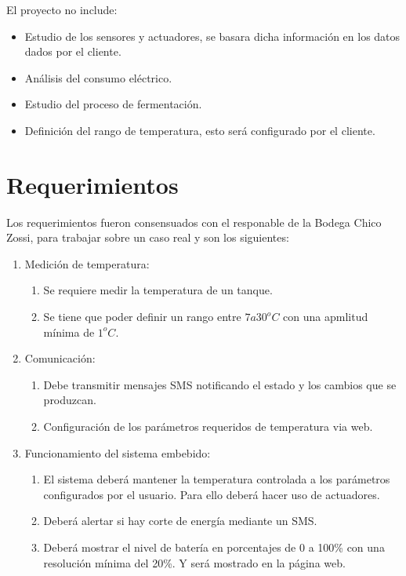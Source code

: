 El proyecto no include:
  \begin{itemize}
    \item Estudio de los sensores y actuadores, se basara dicha información en los datos dados por el cliente. 
    \item Análisis del consumo eléctrico.
    \item Estudio del proceso de fermentación.
    \item Definición del rango de temperatura, esto será configurado por el cliente.
  \end{itemize}

  \section{Requerimientos}

Los requerimientos fueron consensuados con el responable de la Bodega Chico Zossi, para trabajar sobre un caso real y son los siguientes:

\begin{enumerate}[label*=\arabic*.]
  \item Medición de temperatura:
    \begin{enumerate}[label*=\arabic*.]
      \item Se requiere medir la temperatura de un tanque.
      \item Se tiene que poder definir un rango entre $7 a 30^oC$ con una apmlitud mínima de $1^oC$.
    \end{enumerate}
  \item Comunicación:
    \begin{enumerate}[label*=\arabic*.]
      \item Debe transmitir mensajes SMS notificando el estado y los cambios que se produzcan.
      \item Configuración de los parámetros requeridos de temperatura via web. 
    \end{enumerate}
  \item Funcionamiento del sistema embebido:
    \begin{enumerate}[label*=\arabic*.]
      \item El sistema deberá mantener la temperatura controlada a los parámetros configurados por el usuario. Para ello deberá hacer uso de actuadores.
      \item Deberá alertar si hay corte de energía mediante un SMS.
      \item Deberá mostrar el nivel de batería en porcentajes de 0 a 100\%  con una resolución mínima del 20\%. Y será mostrado en la página web.
  \end{enumerate}
\end{enumerate}


